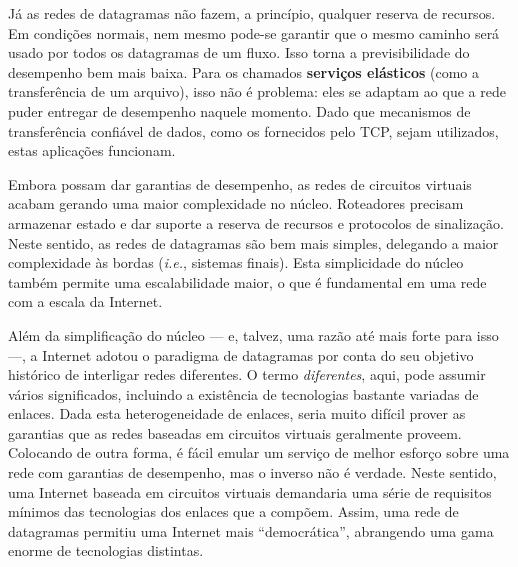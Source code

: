 \documentclass{article}
\begin{document}
Já as redes de datagramas não fazem, a princípio, qualquer reserva de recursos. Em condições normais, nem mesmo pode-se garantir que o mesmo caminho será usado por todos os datagramas de um fluxo. Isso torna a previsibilidade do desempenho bem mais baixa. Para os chamados \textbf{serviços elásticos} (como a transferência de um arquivo), isso não é problema: eles se adaptam ao que a rede puder entregar de desempenho naquele momento. Dado que mecanismos de transferência confiável de dados, como os fornecidos pelo TCP, sejam utilizados, estas aplicações funcionam.

Embora possam dar garantias de desempenho, as redes de circuitos virtuais acabam gerando uma maior complexidade no núcleo. Roteadores precisam armazenar estado e dar suporte a reserva de recursos e protocolos de sinalização. Neste sentido, as redes de datagramas são bem mais simples, delegando a maior complexidade às bordas (\textit{i.e.}, sistemas finais). Esta simplicidade do núcleo também permite uma escalabilidade maior, o que é fundamental em uma rede com a escala da Internet.

Além da simplificação do núcleo --- e, talvez, uma razão até mais forte para isso ---, a Internet adotou o paradigma de datagramas por conta do seu objetivo histórico de interligar redes diferentes. O termo \textit{diferentes}, aqui, pode assumir vários significados, incluindo a existência de tecnologias bastante variadas de enlaces. Dada esta heterogeneidade de enlaces, seria muito difícil prover as garantias que as redes baseadas em circuitos virtuais geralmente proveem. Colocando de outra forma, é fácil emular um serviço de melhor esforço sobre uma rede com garantias de desempenho, mas o inverso não é verdade. Neste sentido, uma Internet baseada em circuitos virtuais demandaria uma série de requisitos mínimos das tecnologias dos enlaces que a compõem. Assim, uma rede de datagramas permitiu uma Internet mais ``democrática'', abrangendo uma gama enorme de tecnologias distintas. 
\end{document}
